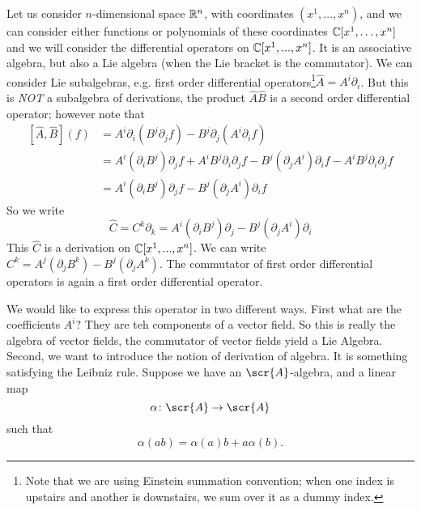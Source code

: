 
Let us consider $n$-dimensional space $\Bbb{R}^{n}$, with
coordinates $(x^1,\ldots,x^n)$, and we can consider either
functions or polynomials of these coordinates
$\Bbb{C}[x^1,\ldots,x^n]$ and we will consider the differential
operators on $\Bbb{C}[x^1,...,x^n]$. It is an associative
algebra, but also a Lie algebra (when the Lie bracket is the
commutator). We can consider Lie subalgebras, e.g. first order
differential operators\footnote{Note that we are using Einstein
  summation convention; when one index is upstairs and another is
  downstairs, we sum over it as a dummy index.}$\widehat{A}=A^{i}\partial_{i}$. But this
is \emph{NOT} a subalgebra of derivations, the product
$\widehat{A}\widehat{B}$ is a second order differential operator;
however note that
\begin{subequations}
\begin{align}
[\widehat{A},\widehat{B}](f)&=A^{i}\partial_{i}(B^{j}\partial_{j}f)-B^{j}\partial_{j}(A^{i}\partial_{i}f)\\
&=A^{i}(\partial_{i}B^{j})\partial_{j}f+A^{i}B^{j}\partial_{i}\partial_{j}f-B^{j}(\partial_{j}A^{i})\partial_{i}f-A^{i}B^{j}\partial_{i}\partial_{j}f\\
&=A^{i}(\partial_{i}B^{j})\partial_{j}f-B^{j}(\partial_{j}A^{i})\partial_{i}f
\end{align}
\end{subequations}
So we write
\begin{equation}
\widehat{C}=C^{k}\partial_{k}=A^{i}(\partial_{i}B^{j})\partial_{j}-B^{j}(\partial_{j}A^{i})\partial_{i}
\end{equation}
This $\widehat{C}$ is a derivation on $\Bbb{C}[x^1,...,x^n]$. We
can write
$C^k=A^{j}(\partial_{j}B^{k})-B^{j}(\partial_{j}A^{k})$. The
commutator of first order differential operators is again a first
order differential operator.

We would like to express this operator in two different
ways. First what are the coefficients $A^i$? They are teh
components of a vector field. So this is really the algebra of
vector fields, the commutator of vector fields yield a Lie
Algebra. Second, we want to introduce the notion of derivation of
algebra. It is something satisfying the Leibniz rule. Suppose we
have an $\scr{A}$-algebra, and a linear map
\begin{equation}
\alpha\colon\scr{A}\to\scr{A}
\end{equation}
such that
\begin{equation}
\alpha(ab)=\alpha(a)b+a\alpha(b).
\end{equation}

